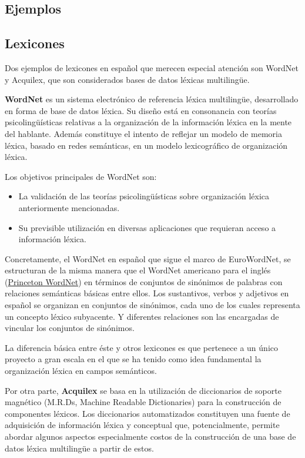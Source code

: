 \documentclass[11pt]{exam}
\begin{document}
\begin{questions}
\section*{Ejemplos}

\subsection*{Lexicones}

Dos ejemplos de lexicones en español que merecen especial atención son WordNet y Acquilex, que son considerados bases de datos léxicas multilingüe. 

{\bf WordNet} es un sistema electrónico de referencia léxica multilingüe, desarrollado en forma de base de datos léxica. Su diseño está en consonancia con teorías psicolingüísticas relativas a la organización de la información léxica en la mente del hablante. Además constituye el intento de reflejar un modelo de memoria léxica, basado en redes semánticas, en un modelo lexicográfico de organización léxica. 

Los objetivos principales de WordNet son: 

\begin{itemize}
	\item La validación de las teorías psicolingüísticas sobre organización léxica anteriormente mencionadas.
	\item Su previsible utilización en diversas aplicaciones que requieran acceso a información léxica.
\end{itemize}

Concretamente, el WordNet en español que sigue el marco de EuroWordNet, se estructuran de la misma manera que el WordNet americano para el inglés (\href{https://wordnet.princeton.edu/}{Princeton WordNet}) en términos de conjuntos de sinónimos de palabras con relaciones semánticas básicas entre ellos. Los sustantivos, verbos y adjetivos en español se organizan en conjuntos de sinónimos, cada uno de los cuales representa un concepto léxico subyacente. Y diferentes relaciones son las encargadas de vincular los conjuntos de sinónimos. 

La diferencia básica entre éste y otros lexicones es que pertenece a un único proyecto a gran escala en el que se ha tenido como idea fundamental la organización léxica en campos semánticos. 

Por otra parte, {\bf Acquilex} se basa en la utilización de diccionarios de soporte magnético (M.R.Ds, Machine Readable Dictionaries) para la construcción de componentes léxicos. Los diccionarios automatizados constituyen una fuente de adquisición de información léxica y conceptual que, potencialmente, permite abordar algunos aspectos especialmente costos de la construcción de una base de datos léxica multilingüe a partir de estos.


\end{questions}
\end{document}
